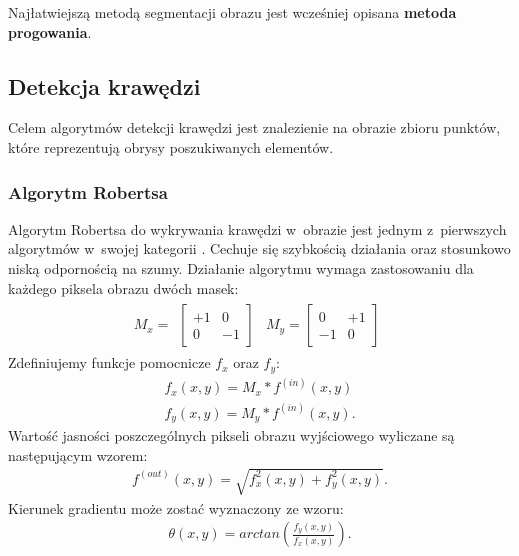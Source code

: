Najłatwiejszą metodą segmentacji obrazu jest wcześniej opisana \textbf{metoda progowania}.
\subsection{Detekcja krawędzi}
Celem algorytmów detekcji krawędzi jest znalezienie na obrazie zbioru punktów, które reprezentują obrysy poszukiwanych elementów. 

\subsubsection{Algorytm Robertsa}
Algorytm Robertsa do wykrywania krawędzi w~obrazie jest jednym z~pierwszych algorytmów w~swojej kategorii \cite{roberts63}. Cechuje się szybkością działania oraz stosunkowo niską odpornością na szumy. Działanie algorytmu wymaga zastosowaniu dla każdego piksela obrazu dwóch masek:
\begin{gather*}
  M_x = \begin{matrix}
    \begin{bmatrix}
      +1 & 0 \\
      0 & -1
    \end{bmatrix}
    &
    M_y = \begin{bmatrix}
      0 & +1 \\
      -1 & 0
    \end{bmatrix}
  \end{matrix}
\end{gather*}
Zdefiniujemy funkcje pomocnicze $f_x$ oraz $f_y$:
\begin{gather*}
  f_x(x, y) = M_x * f^{(in)}(x, y) \\
  f_y(x, y) = M_y * f^{(in)}(x, y).
\end{gather*}
Wartość jasności poszczególnych pikseli obrazu wyjściowego wyliczane są następującym wzorem:
\begin{gather*}
  f^{(out)}(x, y) = \sqrt{f_x^2(x, y)+f_{y}^2(x, y)}.
\end{gather*}
Kierunek gradientu może zostać wyznaczony ze wzoru:
\begin{gather*}
  \theta(x, y) = arctan(\frac{f_{y}(x, y)}{f_{x}(x, y)}).
\end{gather*}
